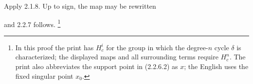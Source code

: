 Apply 2.1.8.  Up to sign, the map may be rewritten
\begin{center}
\end{center}
and 2.2.7 follows.
\footnote{In this proof the print has $H_c^i$ for the group in which
the degree-$n$ cycle $\delta$ is characterized; the displayed maps
and all surrounding terms require $H_c^n$.  The print also abbreviates
the support point in (2.2.6.2) as $x$; the English uses the fixed
singular point $x_0$.}
